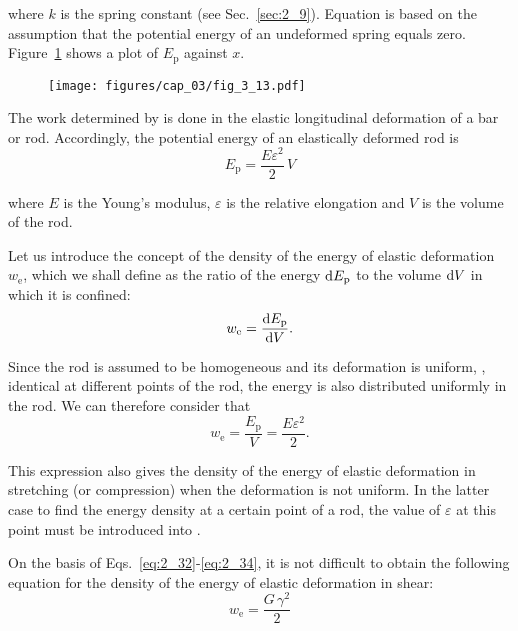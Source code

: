 \noindent
where $k$ is the spring constant (see Sec.~\ref{sec:2_9}). Equation  is based on the assumption that the potential energy of an undeformed spring equals zero. Figure~\ref{fig:3_13} shows a plot of $E_{\text{p}}$ against $x$.

\begin{figure}[t]
	\begin{center}
		\texttt{[image: figures/cap\_03/fig\_3\_13.pdf]}
		\caption[]{}
		\label{fig:3_13}
	\end{center}
	\vspace{-0.7cm}
\end{figure}

The work determined by  is done in the elastic longitudinal deformation of a bar or rod. Accordingly, the potential energy of an elastically deformed rod is
\begin{equation}\label{eq:3_79}
E_{\text{p}} = \frac{E\varepsilon^2}{2}\,V
\end{equation}

\noindent
where $E$ is the Young's modulus, $\varepsilon$ is the relative elongation and $V$ is the volume of the rod.

Let us introduce the concept of the density of the energy of elastic deformation $w_{\text{e}}$, which we shall define as the ratio of the energy $\mathrm{d} E_{\text{p}}$ to the volume $\mathrm{d} V$ in which it is confined:
\begin{equation}\label{eq:3_80}
w_{\text{e}} = \frac{\mathrm{d} E_{\text{p}}}{\mathrm{d} V}.
\end{equation}

\noindent
Since the rod is assumed to be homogeneous and its deformation is uniform, \ie, identical at different points of the rod, the energy  is also distributed uniformly in the rod. We can therefore consider that
\begin{equation}\label{eq:3_81}
w_{\text{e}} = \frac{E_{\text{p}}}{V} = \frac{E\varepsilon^2}{2}.
\end{equation}

\noindent
This expression also gives the density of the energy of elastic deformation in stretching (or compression) when the deformation is not uniform. In the latter case to find the energy density at a certain point of a rod, the value of $\varepsilon$ at this point must be introduced into .

On the basis of Eqs.~\eqref{eq:2_32}-\eqref{eq:2_34}, it is not difficult to obtain the following equation for the density of the energy of elastic deformation in shear:
\begin{equation}\label{eq:3_82}
w_{\text{e}} = \frac{G\,\gamma^2}{2}
\end{equation}

